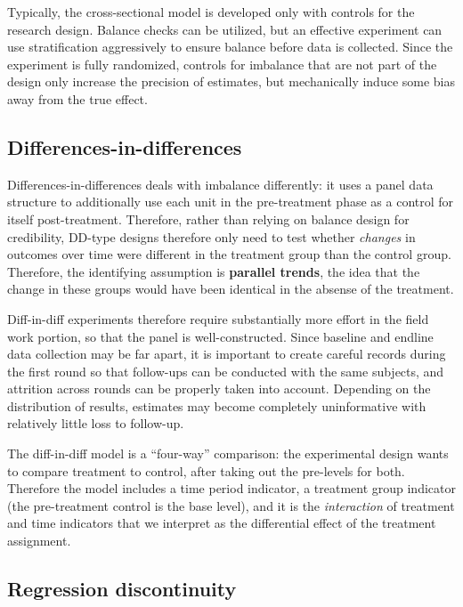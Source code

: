 Typically, the cross-sectional model is developed
only with controls for the research design.
Balance checks can be utilized, but an effective experiment
can use stratification aggressively to ensure balance
before data is collected.\cite{athey2017econometrics}
Since the experiment is fully randomized,
controls for imbalance that are not part of the design
only increase the precision of estimates,
but mechanically induce some bias away from the true effect.

\subsection{Differences-in-differences}

Differences-in-differences deals with imbalance differently:
it uses a panel data structure to additionally use each
unit in the pre-treatment phase as a control for itself post-treatment.
Therefore, rather than relying on balance design for credibility,
DD-type designs therefore only need to test whether \textit{changes}
in outcomes over time were different in the treatment group than the control group.
Therefore, the identifying assumption is \textbf{parallel trends},
the idea that the change in these groups would have been identical
in the absense of the treatment.

Diff-in-diff experiments therefore require substantially more effort
in the field work portion, so that the panel is well-constructed.
Since baseline and endline data collection may be far apart,
it is important to create careful records during the first round
so that follow-ups can be conducted with the same subjects,
and attrition across rounds can be properly taken into account.
Depending on the distribution of results,
estimates may become completely uninformative
with relatively little loss to follow-up.

The diff-in-diff model is a ``four-way'' comparison:
the experimental design wants to compare treatment to control,
after taking out the pre-levels for both.
Therefore the model includes a time period indicator,
a treatment group indicator (the pre-treatment control is the base level),
and it is the \textit{interaction} of treatment and time indicators
that we interpret as the differential effect of the treatment assignment.

\subsection{Regression discontinuity}

